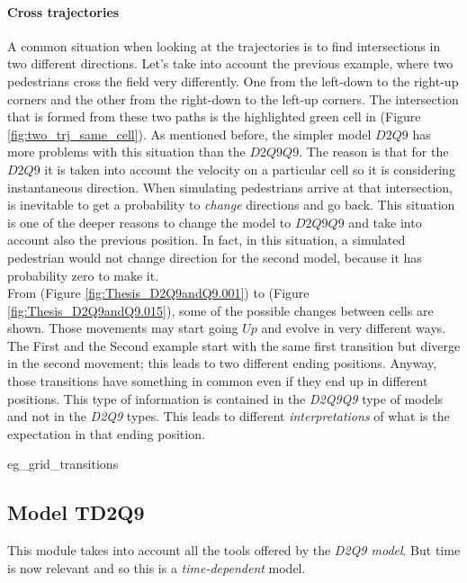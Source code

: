 \documentclass[class=article, crop=false]{standalone}
\begin{document}
\paragraph{Cross trajectories}
A common situation when looking at the trajectories is to find intersections in two different directions.
Let's take into account the previous example, where two pedestrians cross the field very differently.
One from the left-down to the right-up corners and the other from the right-down to the left-up corners.
The intersection that is formed from these two paths is the highlighted green cell in (Figure \ref{fig:two_trj_same_cell}).
As mentioned before, the simpler model $D2Q9$ has more problems with this situation than the $D2Q9Q9$.
The reason is that for the $D2Q9$ it is taken into account the velocity on a particular cell so it is considering instantaneous direction. 
When simulating pedestrians arrive at that intersection, is inevitable to get a probability to \emph{change} directions and go back.
This situation is one of the deeper reasons to change the model to $D2Q9Q9$ and take into account also the previous position.
In fact, in this situation, a simulated pedestrian would not change direction for the second model, because it has probability zero to make it.
\\From (Figure \ref{fig:Thesis_D2Q9andQ9.001})  to  (Figure \ref{fig:Thesis_D2Q9andQ9.015}), some of the possible changes between cells are shown. 
Those movements may start going $Up$ and evolve in very different ways. 
The First and the Second example start with the same first transition but diverge in the second movement; this leads to two different ending positions. 
Anyway, those transitions have something in common even if they end up in different positions. 
This type of information is contained in the \emph{D2Q9Q9} type of models and not in the \emph{D2Q9} types. 
This leads to different \emph{interpretations} of what is the expectation in that ending position.

	{eg_grid_transitions}



\FloatBarrier
\newpage
\subsection{Model TD2Q9}
This module takes into account all the tools offered by the \emph{D2Q9 model}.
But time is now relevant and so this is a \emph{time-dependent} model.
\end{document}
